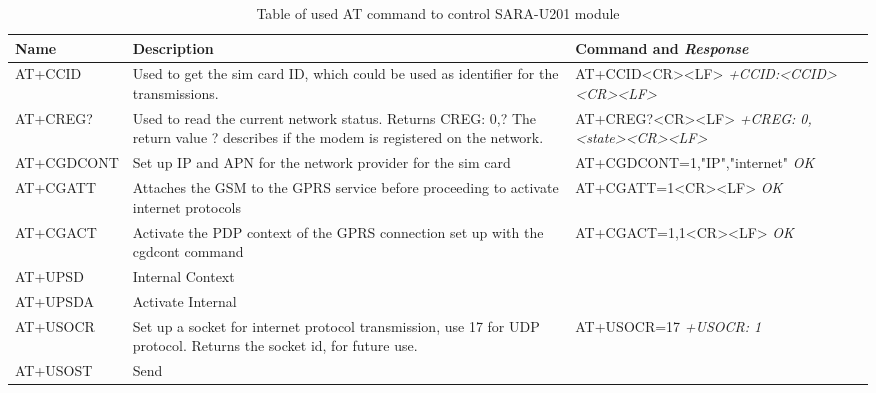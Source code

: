 \begin{table}
	\begin{tabularx}{\textwidth}{p{2cm} X X}
		\toprule
		Name & Description & Command and \textit{Response} \\
		\midrule
		AT+CCID & Used to get the sim card ID, which could be used as identifier for the transmissions. & AT+CCID<CR><LF> \newline \newline
		\textit{+CCID:<CCID><CR><LF>} \\ 
		AT+CREG? & Used to read the current network status. Returns CREG: 0,? \newline
		The return value ? describes if the modem is registered on the network. & AT+CREG?<CR><LF> \newline \newline
		\textit{+CREG: 0,<state><CR><LF>} \\
		AT+CGDCONT & Set up IP and APN for the network provider for the sim card & AT+CGDCONT=1,"IP","internet" \newline \newline
		\textit{OK} \\
		AT+CGATT & Attaches the GSM to the GPRS service before proceeding to activate internet protocols & AT+CGATT=1<CR><LF> \newline \newline
		\textit{OK} \\
		AT+CGACT & Activate the PDP context of the GPRS connection set up with the cgdcont command & AT+CGACT=1,1<CR><LF> \newline \newline
		\textit{OK} \\
		AT+UPSD & Internal Context& \\
		AT+UPSDA & Activate Internal& \\
		AT+USOCR & Set up a socket for internet protocol transmission, use 17 for UDP protocol. Returns the socket id, for future use.& AT+USOCR=17 \newline \newline
		\textit{+USOCR: 1} \\
		AT+USOST & Send & \\
		\bottomrule
	\end{tabularx}
	\caption{Table of used AT command to control SARA-U201 module}
	\label{tab:ATDesc}
\end{table}


